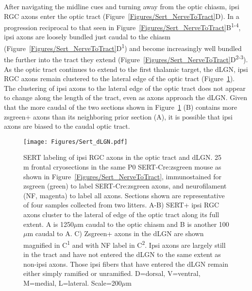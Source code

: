 After navigating the midline cues and turning away from the optic chiasm, ipsi RGC axons enter the optic tract (Figure~\ref{Figures/Sert_NerveToTract}D).
In a progression reciprocal to that seen in Figure~\ref{Figures/Sert_NerveToTract}B\textsuperscript{1-4}, ipsi axons are loosely bundled just caudal to the chiasm (Figure~\ref{Figures/Sert_NerveToTract}D\textsuperscript{1}) and become increasingly well bundled the further into the tract they extend (Figure~\ref{Figures/Sert_NerveToTract}D\textsuperscript{2-3}).
As the optic tract continues to extend to the first thalamic target, the dLGN, ipsi RGC axons remain clustered to the lateral edge of the optic tract (Figure~\ref{Figures/Sert_dLGN}).
The clustering of ipsi axons to the lateral edge of the optic tract does not appear to change along the length of the tract, even as axons approach the dLGN.
Given that the more caudal of the two sections shown in Figure~\ref{Figures/Sert_dLGN} (B) contains more zsgreen+ axons than its neighboring prior section (A), it is possible that ipsi axons are biased to the caudal optic tract.

\begin{figure}[hbtp]
	\begin{center}
		\texttt{[image: Figures/Sert\_dLGN.pdf]}
		\caption[SERT labeling of ipsi RGC axons in the optic tract and dLGN.]
		{SERT labeling of ipsi RGC axons in the optic tract and dLGN.
		25 \mu m frontal cryosections in the same P0 SERT-Cre:zsgreen mouse as shown in Figure~\ref{Figures/Sert_NerveToTract}, immunostained for zsgreen (green) to label SERT-Cre:zsgreen axons, and neurofilament (NF, magenta) to label all axons.
		Sections shown are representative of four samples collected from two litters. %
		A-B) SERT+ ipsi RGC axons cluster to the lateral of edge of the optic tract along its full extent. 
		A is 1250$\mu$m caudal to the optic chiasm and B is another 100$\mu$m caudal to A.
		C) Zsgreen+ axons in the dLGN are shown magnified in C\textsuperscript{1} and with NF label in C\textsuperscript{2}.
		Ipsi axons are largely still in the tract and have not entered the dLGN to the same extent as non-ipsi axons.
		Those ipsi fibers that have entered the dLGN remain either simply ramified or unramified.
		D=dorsal, V=ventral, M=medial, L=lateral. Scale=200$\mu$m}
		\label{Figures/Sert_dLGN}
	\end{center}
\end{figure}
